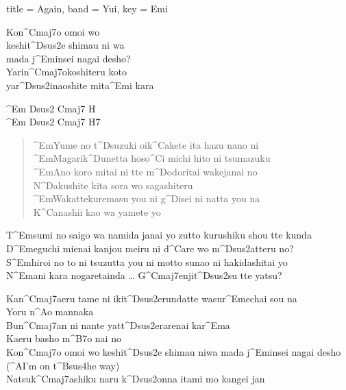 \begin{song}[
	remember-chords = true ,
	verse/numbered = true ,
	transpose-capo = true 
	]{
		title = Again,
		band = Yui,
		key  = Emi
	}	
	\begin{intro}
		Kon^{Cmaj7}o omoi wo \\ keshit^{Dsus2}e shimau ni wa \\
		mada j^{Em}insei nagai desho?\\
		Yarin^{Cmaj7}okoshiteru koto \\
		yar^{Dsus2}inaoshite mita^{Em}i kara \\ 
	\end{intro}

	\begin{intro*}
		^{Em Dsus2 Cmaj7 H} \\
		^{Em Dsus2 Cmaj7 H7}
	\end{intro*}

	\begin{verse}
		^{Em}Yume no t^{D}suzuki oik^{C}akete ita hazu nano ni \\
		^{Em}Magarik^{D}unetta hoso^{C}i michi hito ni tsumazuku \\
		^{Em}Ano koro mitai ni tte m^{D}odoritai wakejanai no \\
		N^{D}akushite kita sora wo sagashiteru \\
		^{Em}Wakattekuremasu you ni g^{D}isei ni natta you na \\
		K^{C}anashii kao wa yamete yo\\
	\end{verse}

	\begin{bridge}
		T^{Em}sumi no saigo wa namida janai yo zutto kurushiku shou tte kunda \\
		D^{Em}eguchi mienai kanjou meiru ni d^{C}are wo m^{Dsus2}atteru no? \\
		S^{Em}hiroi no to ni tsuzutta you ni motto sunao ni hakidashitai yo \\
		N^{Em}ani kara nogaretainda … G^{Cmaj7}enjit^{Dsus2}su tte yatsu? \\
	
	\end{bridge}
	
	\begin{chorus}
		Kan^{Cmaj7}aeru tame ni ikit^{Dsus2}erundatte wasur^{Em}echai sou na \\
		Yoru n^{A}o mannaka \\
		Bun^{Cmaj7}an ni nante yatt^{Dsus2}erarenai kar^{Em}a \\
		Kaeru basho m^{B7}o nai no \\
		Kon^{Cmaj7}o omoi wo keshit^{Dsus2}e shimau niwa mada j^{Em}insei nagai desho \\
		(^{A}I’m on t^{Bsus4}he way) \\
		Natsuk^{Cmaj7}ashiku naru k^{Dsus2}onna itami mo kangei jan \\
	\end{chorus}
\end{song}